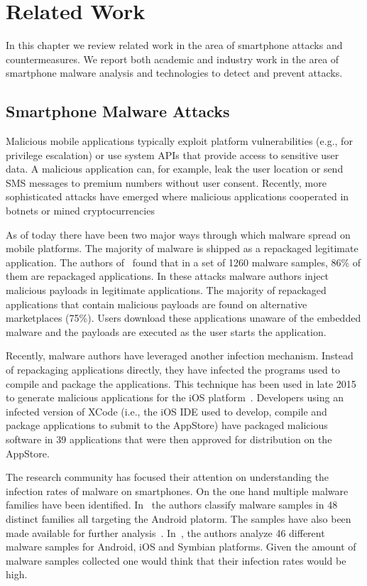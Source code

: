 \chapter{Related Work}
\label{chap:sp_relatedwork}

In this chapter we review related work in the area of smartphone attacks and countermeasures. We report both academic and industry work in the area of smartphone malware analysis and technologies to detect and prevent attacks.

\section{Smartphone Malware Attacks}

Malicious mobile applications typically exploit platform vulnerabilities (e.g., for privilege escalation) or use system APIs that provide access to sensitive user data. A malicious application can, for example, leak the user location or send SMS messages to premium numbers without user consent. Recently, more sophisticated attacks have emerged where malicious applications cooperated in botnets or mined cryptocurrencies~\cite{lookout2014}

As of today there have been two major ways through which malware spread on mobile platforms. The majority of malware is shipped as a repackaged legitimate application. The authors of~\cite{zhou-jiang12sp} found that in a set of 1260 malware samples, 86\% of them are repackaged applications. In these attacks malware authors inject malicious payloads in legitimate applications. The majority of repackaged applications that contain malicious payloads are found on alternative marketplaces (75\%). Users download these applications unaware of the embedded malware and the payloads are executed as the user starts the application.

Recently, malware authors have leveraged another infection mechanism. Instead of repackaging applications directly, they have infected the programs used to compile and package the applications. This technique has been used in late 2015 to generate malicious applications for the iOS platform~\cite{xcodeghost}. Developers using an infected version of XCode (i.e., the iOS IDE used to develop, compile and package applications to submit to the AppStore) have packaged malicious software in 39 applications that were then approved for distribution on the AppStore.

The research community has focused their attention on understanding the infection rates of malware on smartphones. On the one hand multiple malware families have been identified. In~\cite{zhou-jiang12sp} the authors classify malware samples in 48 distinct families all targeting the Android platorm. The samples have also been made available for further analysis~\cite{malwaregenome}. In~\cite{felt11w2sp}, the authors analyze 46 different malware samples for Android, iOS and Symbian platforms. Given the amount of malware samples collected one would think that their infection rates would be high. 

